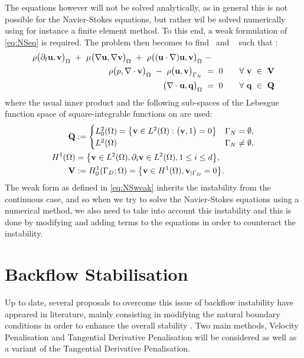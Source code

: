 The equations however will not be solved analytically, as in general this is not possible for the Navier-Stokes equations, but rather wil be solved numerically using for instance a finite element method. To this end, a weak formulation of \eqref{eq:NSeq}  is required. The problem then becomes to find \bmu~and ~ such that \cite[433]{alfioquarteroni2014}:
\begin{align}\label{eq:NSweak}
\begin{split}
    \rho\big(\partial_t{\textbf{u}},{\textbf{v}}\big)_{\Omega} ~+~
    \mu\big(\nabla{\textbf{u}},\nabla{\textbf{v}}\big)_{\Omega} ~+~
    \rho\big(\qty({\textbf{u}}\cdot\nabla){\textbf{u}},{\textbf{v}}\big)_{\Omega} ~&-~\\
    \rho\big(p,\nabla\cdot{\textbf{v}}\big)_{\Omega} ~-~
    \rho\big({\textbf{u}},{\textbf{v}}\big)_{\Gamma_N} ~&=~ 0 \qquad \forall~{\textbf{v}}~\in~\mathbf{V}\\
    \big(\nabla\cdot{\textbf{u}},\textbf{q}\big)_{\Omega} ~&=~ 0 \qquad \forall~\textbf{q}~\in~\mathbf{Q}
\end{split}
\end{align}
where the usual inner product  and the following sub-spaces of the Lebesgue function space  of square-integrable functions on \mathm{\Omega} are used:
\begin{align*}
\mathbf{Q} &:= \begin{cases}L^2_0\qty(\Omega) = \qty{{\textbf{v}}\in L^2\qty(\Omega) : \big({\textbf{v}},1\big)=0} & \Gamma_N = \emptyset,\\
L^2\qty(\Omega) & \Gamma_N \neq \emptyset,\end{cases}\\
H^1\qty(\Omega) &= \qty{{\textbf{v}}\in L^2\qty(\Omega), \partial_i {\textbf{v}}\in L^2\qty(\Omega), 1\leq i \leq d},\\
\mathbf{V} &:= H^1_0\qty(\Gamma_D;\Omega) = \qty{{\textbf{v}}\in H^1\qty(\Omega), {\textbf{v}}_{|\Gamma_D} = 0}.\\
\end{align*}
The weak form as defined in \eqref{eq:NSweak} inherits the instability from the continuous case, and so when we try to solve the Navier-Stokes equations using a numerical method, we also need to take into account this instability and this is done by modifying and adding terms to the equations in order to counteract the instability.

\section{Backflow Stabilisation}
Up to date, several proposals to overcome this issue of backflow instability have appeared in literature, mainly consisting in modifying the natural boundary conditions in order to enhance the overall stability \cite{bertoglio2017}. Two main methods, Velocity Penalisation and Tangential Derivative Penalisation will be considered as well as a variant of the Tangential Derivative Penalisation. 

